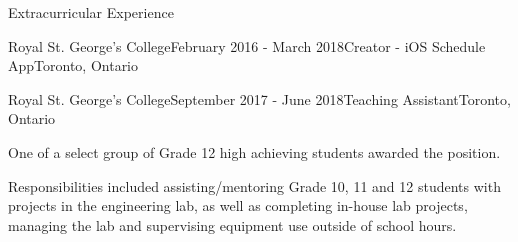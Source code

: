 \documentclass{resume} %
\begin{document}
\begin{rSection}{Extracurricular Experience}
\begin{rSubsection}{Royal St. George's College}{February 2016 - March
    2018}{Creator - iOS Schedule App}{Toronto, Ontario}
\end{rSubsection}

\begin{rSubsection}{Royal St. George's College}{September 2017 - June
    2018}{Teaching Assistant}{Toronto, Ontario}
\item One of a select group of Grade 12 high achieving students awarded the position.
\item Responsibilities included assisting/mentoring Grade 10, 11 and 12 students with projects in
  the engineering lab, as well as completing in-house lab projects, managing the lab and
  supervising equipment use outside of school hours.
\end{rSubsection}

\end{rSection}
\end{document}
